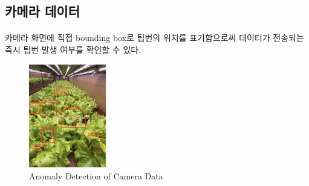 \documentclass[11pt]{article}
\begin{document}
    \subsection{카메라 데이터} 
    \paragraph{} 카메라 화면에 직접 bounding box로 팁번의 위치를 표기함으로써 데이터가 전송되는 즉시 팁번 발생 여부를 확인할 수 있다. 

    \begin{figure}[h]
    \centering
    \includegraphics[width=0.3\textwidth]{Latex_Proposal/images/tipburn_ex.png} %
    \caption{Anomaly Detection of Camera Data }
    \label{fig:tipburn_ex}
    \end{figure}

    \pagebreak
    
    
\end{document}
